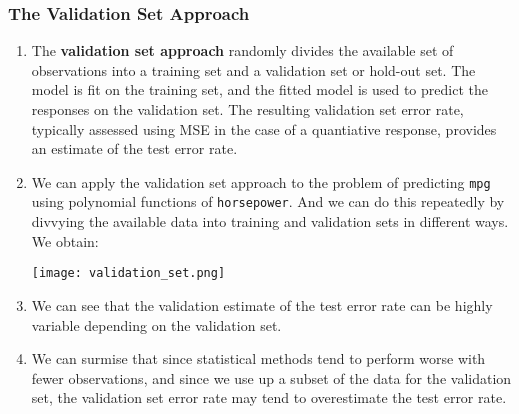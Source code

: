 \documentclass[10pt]{article}
\begin{document}
\subsubsection{The Validation Set Approach}

\begin{enumerate}
	\item The \textbf{validation set approach} randomly divides the available set of observations into a training set and a validation set or hold-out set.  The model is fit on the training set, and the fitted model is used to predict the responses on the validation set.  The resulting validation set error rate, typically assessed using MSE in the case of a quantiative response, provides an estimate of the test error rate.
	\item We can apply the validation set approach to the problem of predicting {\tt mpg} using polynomial functions of {\tt horsepower}.  And we can do this repeatedly by divvying the available data into training and validation sets in different ways.  We obtain:
	
	\texttt{[image: validation\_set.png]}

	\item We can see that the validation estimate of the test error rate can be highly variable depending on the validation set.
	\item We can surmise that since statistical methods tend to perform worse with fewer observations, and since we use up a subset of the data for the validation set, the validation set error rate may tend to overestimate the test error rate.
\end{enumerate}
\end{document}

